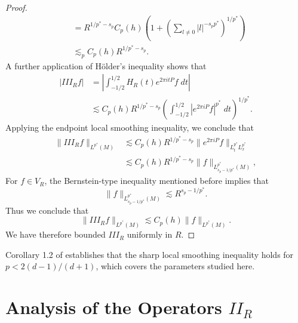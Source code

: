 \begin{proof}
\begin{align*}
        &= R^{1/p^* - s_p} C_p(h) \left( 1 + \left( \sum_{l \neq 0} |l|^{-s_p p^*} \right)^{1/p^*} \right) \\
        &\lesssim_p C_p(h) R^{1/p^* - s_p}.
    \end{align*}
    A further application of H\"{o}lder's inequality shows that
    \begin{align*}
        | III_R f | &= \left| \int_{-1/2}^{1/2} H_R(t) e^{2 \pi i t P} f\; dt \right|\\
        &\lesssim C_p(h) R^{1/p^* - s_p} \left( \int_{-1/2}^{1/2} |e^{2 \pi i P} f|^{p^*}\; dt \right)^{1/p^*}.
    \end{align*}
    Applying the endpoint local smoothing inequality, we conclude that
    \begin{align*}
        \| III_R f \|_{L^{p^*}(M)} &\lesssim C_p(h) R^{1/p^* - s_p} \| e^{2 \pi i P} f \|_{L^{p^*}_t L^{p^*}_x}\\
        &\lesssim C_p(h) R^{1/p^* - s_p} \| f \|_{L^{p^*}_{s_p - 1/p^*}(M)},
    \end{align*}
    For $f \in V_R$, the Bernstein-type inequality mentioned before implies that
    \[ \| f \|_{L^{p^*}_{s_p - 1/p^*}(M)} \lesssim R^{s_p - 1/p^*}. \]
    Thus we conclude that
    \[ \| III_R f \|_{L^{p^*}(M)} \lesssim C_p(h) \| f \|_{L^{p^*}(M)}. \]
    We have therefore bounded $III_R$ uniformly in $R$.
\end{proof}

Corollary 1.2 of \cite{LeeSeeger} establishes that the sharp local smoothing inequality holds for $p < 2(d-1)/(d+1)$, which covers the parameters studied here.

\section{Analysis of the Operators $II_R$}

